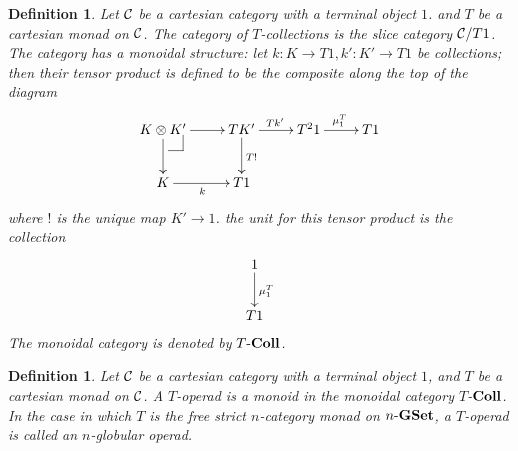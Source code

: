 \documentclass[12pt]{article}
\makeatletter
\theoremstyle{plain}
\newtheorem{definition}[theorem]{Definition}
\theoremstyle{definition}
\newcommand{\pullbackmark}[2]{\save ;p+<.8pc,0pc>:(0,-1)::%
(#1) *{\phantom{Z}} %
;p+(#2)-(0,0) **@{-}%
;p-(#1)+(0,0) *{\phantom{Z}} **@{-} \restore}
\makeatother
\begin{document}
\begin{definition}
Let ${\cal C}$ be a cartesian category with a terminal object $1$. and $T$ be a cartesian monad on ${\cal C}$. The category of {\em $T$-collections} is the slice category ${\cal C}/T1$. The category has a monoidal structure: let $k: K \rightarrow T1, k': K' \rightarrow T1$ be collections; then their tensor product is defined to be the composite along the top of the diagram
\[ \xymatrix{
K \otimes K' \ar[r] \ar[d] \pullbackmark{0,1.5}{1.5,0} & TK' \ar[r]^{Tk'} \ar[d]^{T!} & T^2 1 \ar[r]^{\mu^T_1} & T1 \\
K \ar[r]_k & T1 & &
} \]
where $!$ is the unique map $K' \rightarrow 1$. the unit for this  tensor product is the collection
\[ \xymatrix{
1 \ar[d]^{\mu^T_1} \\
T1
} \]
The monoidal category is denoted by $T \mathchar`- {\bf Coll}$. 
\end{definition}

\begin{definition}
Let ${\cal C}$ be a cartesian category with a terminal object $1$, and $T$ be a cartesian monad on ${\cal C}$. A \emph{$T$-operad} is a monoid  in the monoidal category $T$-${\bf Coll}$. In the case in which $T$ is the free strict $n$-category monad on $n \mathchar`- {\bf GSet}$, a $T$-operad is called an \emph{$n$-globular operad}.
\end{definition}
\end{document}
